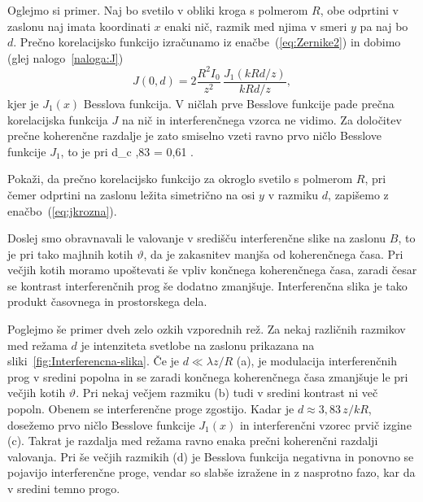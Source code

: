 Oglejmo si primer. Naj bo svetilo v obliki kroga 
s polmerom $R$, obe odprtini v zaslonu naj imata koordinati $x$ enaki nič, razmik
med njima v smeri $y$ pa naj bo $d$. 
Prečno korelacijsko funkcijo izračunamo iz enačbe~(\ref{eq:Zernike2}) in dobimo 
(glej nalogo~\ref{naloga:J})
\begin{equation}
J(0,d)=2\frac{R^{2}I_{0}}{z^{2}}\,\frac{J_{1}(kRd/z)}{kRd/z},
\label{eq:jkrozna}
\end{equation}
kjer je $J_{1}(x)$ Besslova funkcija. V ničlah prve Besslove funkcije
pade prečna korelacijska funkcija $J$ na nič in interferenčnega vzorca ne vidimo. 
Za določitev prečne koherenčne razdalje je zato smiselno vzeti ravno prvo ničlo Besslove funkcije
$J_1$, to je pri
\beq
\label{eq:okroglo_svetilo}
d_{c} ,83  = 0,61 .
\eeq
\begin{definition}
\label{naloga:J}
Pokaži, da prečno korelacijsko funkcijo za okroglo svetilo s polmerom $R$, pri čemer
odprtini na zaslonu ležita simetrično na osi $y$ v razmiku $d$, zapišemo z enačbo~(\ref{eq:jkrozna}). 
\end{definition}

Doslej smo obravnavali le valovanje v središču interferenčne slike na
zaslonu $B$, to je pri tako majhnih kotih $\vartheta$, da je zakasnitev
manjša od koherenčnega časa. Pri večjih kotih moramo upoštevati še
vpliv končnega koherenčnega časa, zaradi česar se kontrast interferenčnih
prog še dodatno zmanjšuje. Interferenčna slika je 
tako produkt časovnega in prostorskega dela. 

Poglejmo še primer dveh zelo ozkih vzporednih rež. 
Za nekaj različnih razmikov med režama $d$ je intenziteta
svetlobe na zaslonu prikazana na sliki~\ref{fig:Interferencna-slika}.
Če je $d\ll\lambda z/R$ (a), je modulacija interferenčnih prog v sredini
popolna in se zaradi končnega koherenčnega časa zmanjšuje le pri večjih
kotih $\vartheta$. Pri nekaj večjem razmiku (b) tudi v sredini kontrast
ni več popoln. Obenem se interferenčne proge zgostijo. Kadar je $d\approx 3,83\,z/kR$,
dosežemo prvo ničlo Besslove funkcije $J_{1}(x)$ in interferenčni vzorec
prvič izgine (c). Takrat je razdalja med režama ravno enaka prečni
koherenčni razdalji valovanja. Pri še večjih razmikih (d) 
je Besslova funkcija negativna in ponovno se pojavijo interferenčne proge, 
vendar so slabše izražene in z nasprotno fazo, kar da v sredini temno progo. 

